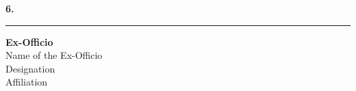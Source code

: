 \begin{flushleft}
\textbf{6.}\\
\rule{8cm}{0.4pt} \hfill \textbf{Ex-Officio}\\
Name of the Ex-Officio\\
Designation\\
Affiliation \\
\vspace{0.2cm}

\end{flushleft}

\pagebreak



